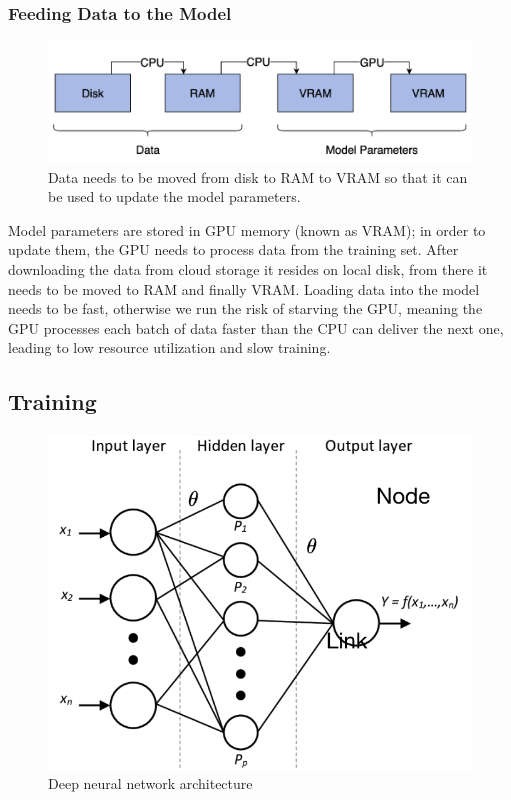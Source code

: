 \subsubsection{Feeding Data to the Model}
\begin{figure}[h]
    \includegraphics[width=\linewidth]{chapters/NLP/figures/ram_cpu_vram.png}
    \caption{Data needs to be moved from disk to RAM to VRAM so that it can be used to update the model parameters.}
    \label{fig:ram_cpu_vram}
\end{figure}
Model parameters are stored in GPU memory (known as VRAM); in order to update them, the GPU needs to process data from the training set.
After downloading the data from cloud storage it resides on local disk, from there it needs to be moved to RAM and finally VRAM.
Loading data into the model needs to be fast, otherwise we run the risk of starving the GPU, meaning the GPU processes each batch of data faster than the CPU can deliver the next one, leading to low resource utilization and slow training.
\subsection{Training}
\begin{figure}[h]
    \includegraphics[width=\linewidth]{chapters/NLP/figures/model_architecture.png}
    \caption{Deep neural network architecture}
    \label{fig:model_architecture}
\end{figure}

